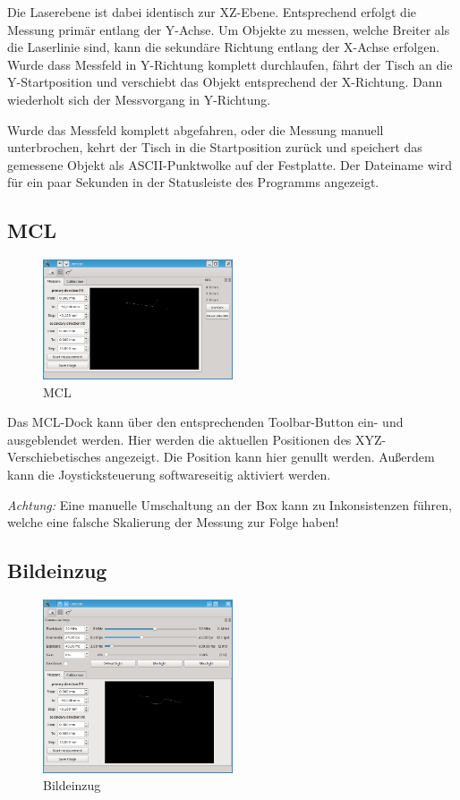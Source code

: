 \documentclass[a4paper,10pt]{scrartcl}
\begin{document}
Die Laserebene ist dabei identisch zur XZ-Ebene. Entsprechend erfolgt die Messung primär entlang
der Y-Achse. Um Objekte zu messen, welche Breiter als die Laserlinie sind, kann die sekundäre
Richtung entlang der X-Achse erfolgen. Wurde dass Messfeld in Y-Richtung komplett durchlaufen,
fährt der Tisch an die Y-Startposition und verschiebt das Objekt entsprechend der X-Richtung.
Dann wiederholt sich der Messvorgang in Y-Richtung.

Wurde das Messfeld komplett abgefahren, oder die Messung manuell unterbrochen, kehrt der Tisch
in die Startposition zurück und speichert das gemessene Objekt als ASCII-Punktwolke auf der
Festplatte. Der Dateiname wird für ein paar Sekunden in der Statusleiste des Programms angezeigt.

\subsection{MCL}

\begin{figure}[H]
  \centering
  \includegraphics[width=0.5\textwidth]{include/mcl.png}
  \caption{MCL}
  \label{fig:overview}
\end{figure}

Das MCL-Dock kann über den entsprechenden Toolbar-Button ein- und ausgeblendet werden.
Hier werden die aktuellen Positionen des XYZ-Verschiebetisches angezeigt. Die Position kann
hier genullt werden. Außerdem kann die Joysticksteuerung softwareseitig aktiviert werden.

\textsl{Achtung:} Eine manuelle Umschaltung an der Box kann zu Inkonsistenzen führen, welche eine
falsche Skalierung der Messung zur Folge haben!

\subsection{Bildeinzug}

\begin{figure}[H]
  \centering
  \includegraphics[width=0.5\textwidth]{include/cam.png}
  \caption{Bildeinzug}
  \label{fig:overview}
\end{figure}
\end{document}
